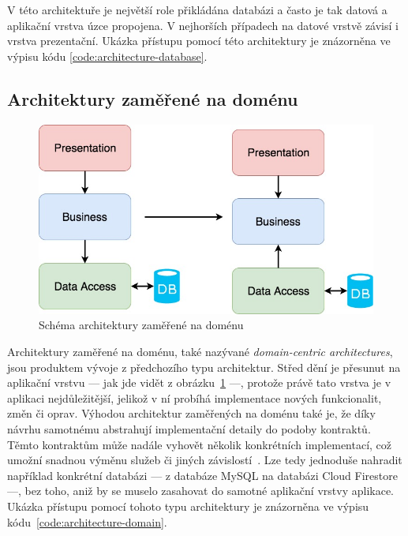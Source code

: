 V této architektuře je největší role přikládána databázi
a často je tak datová a aplikační vrstva úzce propojena.
V nejhorších případech na datové vrstvě závisí i vrstva prezentační.
\cite{architecture}
Ukázka přístupu pomocí této architektury je znázorněna ve výpisu kódu
\ref{code:architecture-database}.

\subsection{Architektury zaměřené na doménu}

\begin{figure}
    \centering
    \includegraphics[width=0.5\linewidth]{assets/technology-research/architecture/domain-centric.jpeg}
    \caption{Schéma architektury zaměřené na doménu ~\cite{architecture}}
    \label{fig:architecture_domain}
\end{figure}

Architektury zaměřené na doménu,
také nazývané \emph{domain-centric architectures},
jsou produktem vývoje z předchozího typu architektur.
Střed dění je přesunut na aplikační vrstvu
--- jak jde vidět z obrázku~\ref{fig:architecture_domain} ---,
protože právě tato vrstva je v aplikaci nejdůležitější,
jelikož v ní probíhá implementace nových funkcionalit, změn či oprav.
\cite{architecture}
\cite[kapitola~15]{martin_clean_architecture}
Výhodou architektur zaměřených na doménu také je,
že díky návrhu samotnému abstrahují implementační detaily do podoby kontraktů.
Těmto kontraktům může nadále vyhovět několik konkrétních implementací,
což umožní snadnou výměnu služeb
či jiných závislostí~\cite{martin_clean_architecture}.
Lze tedy jednoduše nahradit například konkrétní databázi
--- z databáze MySQL na databázi Cloud Firestore ---,
bez toho,
aniž by se muselo zasahovat do samotné aplikační vrstvy aplikace.
Ukázka přístupu pomocí tohoto typu architektury je znázorněna
ve výpisu kódu~\ref{code:architecture-domain}.

